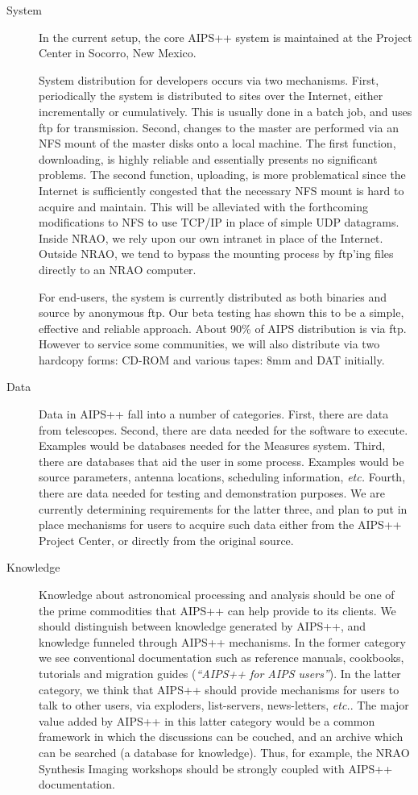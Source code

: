 \begin{description}
\item[System] In the current setup, the core AIPS++ system is maintained 
at the Project Center in Socorro, New Mexico. 

System distribution for developers occurs via two mechanisms. First,
periodically the system is distributed to sites over the Internet,
either incrementally or cumulatively.  This is usually done in a batch
job, and uses ftp for transmission.  Second, changes to the master are
performed via an NFS mount of the master disks onto a local machine.
The first function, downloading, is highly reliable and essentially
presents no significant problems.  The second function, uploading, is
more problematical since the Internet is sufficiently congested that
the necessary NFS mount is hard to acquire and maintain.  This will be
alleviated with the forthcoming modifications to NFS to use TCP/IP in
place of simple UDP datagrams.  Inside NRAO, we rely upon our own
intranet in place of the Internet.  Outside NRAO, we tend to bypass
the mounting process by ftp'ing files directly to an NRAO computer.

For end-users, the system is currently distributed as both binaries
and source by anonymous ftp.  Our beta testing has shown this to be a
simple, effective and reliable approach.  About 90\% of AIPS
distribution is via ftp. However to service some communities, we will
also distribute via two hardcopy forms: CD-ROM and various tapes: 8mm
and DAT initially.

\item[Data] Data in AIPS++ fall into a number of categories. First,
there are data from telescopes.  Second, there are data needed for the
software to execute. Examples would be databases needed for the
Measures system. Third, there are databases that aid the user in some
process. Examples would be source parameters, antenna locations,
scheduling information, {\em etc.}  Fourth, there are data needed for
testing and demonstration purposes.  We are currently determining
requirements for the latter three, and plan to put in place mechanisms
for users to acquire such data either from the AIPS++ Project Center,
or directly from the original source.

\item[Knowledge] Knowledge about astronomical processing and analysis
should be one of the prime commodities that AIPS++ can help provide to
its clients. We should distinguish between knowledge generated by
AIPS++, and knowledge funneled through AIPS++ mechanisms. In the
former category we see conventional documentation such as reference
manuals, cookbooks, tutorials and migration guides ({\em ``AIPS++ for
AIPS users''}).  In the latter category, we think that AIPS++ should
provide mechanisms for users to talk to other users, via exploders,
list-servers, news-letters, {\em etc.}. The major value added by AIPS++
in this latter category would be a common framework in which the
discussions can be couched, and an archive which can be searched (a
database for knowledge). Thus, for example, the NRAO Synthesis
Imaging workshops should be strongly coupled with AIPS++
documentation.


\end{description}
